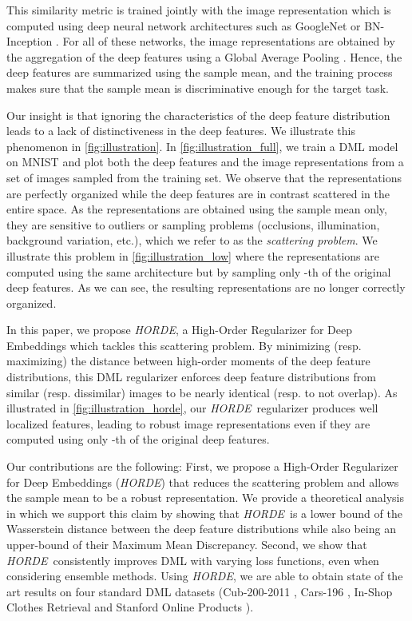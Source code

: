 \documentclass[10pt,twocolumn,letterpaper]{article}
\def\ourmethod{\textit{HORDE}}
\begin{document}
    This similarity metric is trained jointly with the image representation which is computed using deep neural network architectures such as GoogleNet \cite{Szegedy_2015_CVPR} or BN-Inception \cite{Ioffe_2015_ICML}.
    For all of these networks, the image representations are obtained by the aggregation of the deep features using a Global Average Pooling \cite{Zhou_2016_CVPR}.
    Hence, the deep features are summarized using the sample mean, and the training process makes sure that the sample mean is discriminative enough for the target task.
    


    Our insight is that ignoring the characteristics of the deep feature distribution leads to a lack of distinctiveness in the deep features.
    We illustrate this phenomenon in \autoref{fig:illustration}.
    In \autoref{fig:illustration_full}, we train a DML model on MNIST and plot both the deep features and the image representations from a set of images sampled from the training set.
    We observe that the representations are perfectly organized while the deep features are in contrast scattered in the entire space.
    As the representations are obtained using the sample mean only, they are sensitive to outliers or sampling problems (occlusions, illumination, background variation, etc.), which we refer to as the \emph{scattering problem}.
    We illustrate this problem in \autoref{fig:illustration_low} where the representations are computed using the same architecture but by sampling only -th of the original deep features.
    As we can see, the resulting representations are no longer correctly organized.
    
    In this paper, we propose \ourmethod, a High-Order Regularizer for Deep Embeddings which tackles this scattering problem.
    By minimizing (resp. maximizing) the distance between high-order moments of the deep feature distributions, this DML regularizer enforces deep feature distributions from similar (resp. dissimilar) images to be nearly identical (resp. to not overlap).
    As illustrated in \autoref{fig:illustration_horde}, our \ourmethod \ regularizer produces well localized features, leading to robust image representations even if they are computed using only -th of the original deep features.
    
    Our contributions are the following: First, we propose a High-Order Regularizer for Deep Embeddings (\ourmethod) that reduces the scattering problem and allows the sample mean to be a robust representation.
    We provide a theoretical analysis in which we support this claim by showing that \ourmethod \ is a lower bound of the Wasserstein distance between the deep feature distributions while also being an upper-bound of their Maximum Mean Discrepancy.
    Second, we show that \ourmethod \ consistently improves DML with varying loss functions, even when considering ensemble methods. Using \ourmethod, we are able to obtain state of the art results on four standard DML datasets (Cub-200-2011 \cite{CUB_200_2011}, Cars-196 \cite{CARS_196}, In-Shop Clothes Retrieval \cite{Liu_2016_CVPR_INSHOP} and Stanford Online Products \cite{Song_2016_CVPR}).
    
\end{document}
